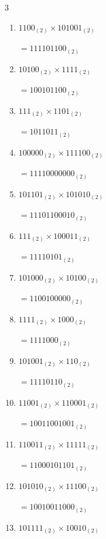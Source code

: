\begin{multicols}{3}
\begin{enumerate}
        $=1001100001_{(2)}$

  \item $1100_{(2)} \times 101001_{(2)}$

        $=111101100_{(2)}$

  \item $10100_{(2)} \times 1111_{(2)}$

        $=100101100_{(2)}$

\columnbreak %

\resetques

  \item $111_{(2)} \times 1101_{(2)}$

        $=1011011_{(2)}$

  \item $100000_{(2)} \times 111100_{(2)}$

        $=11110000000_{(2)}$

  \item $101101_{(2)} \times 101010_{(2)}$

        $=11101100010_{(2)}$

  \item $111_{(2)} \times 100011_{(2)}$

        $=11110101_{(2)}$

  \item $101000_{(2)} \times 10100_{(2)}$

        $=1100100000_{(2)}$

\columnbreak %

  \item $1111_{(2)} \times 1000_{(2)}$

        $=1111000_{(2)}$

  \item $101001_{(2)} \times 110_{(2)}$

        $=11110110_{(2)}$

  \item $11001_{(2)} \times 110001_{(2)}$

        $=10011001001_{(2)}$

  \item $110011_{(2)} \times 11111_{(2)}$

        $=11000101101_{(2)}$

  \item $101010_{(2)} \times 11100_{(2)}$

        $=10010011000_{(2)}$

\columnbreak %

  \item $101111_{(2)} \times 10010_{(2)}$


\end{enumerate}
\end{multicols}
